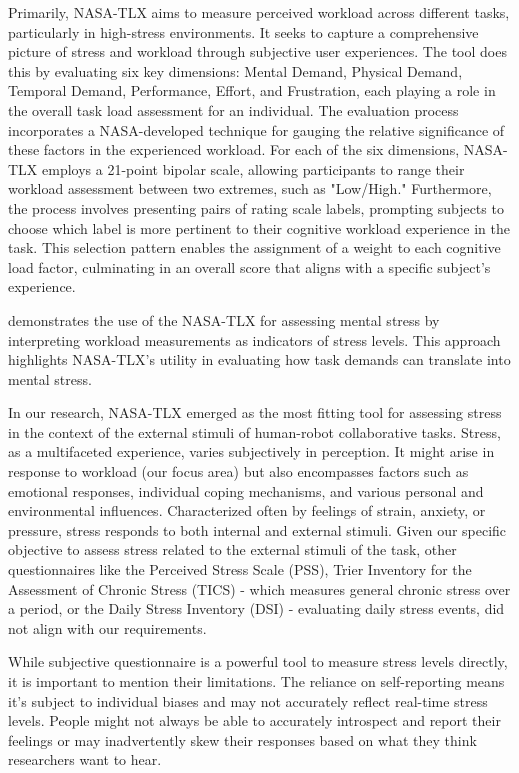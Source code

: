  Primarily, NASA-TLX aims to measure perceived workload across different tasks, particularly in high-stress environments. It seeks to capture a comprehensive picture of stress and workload through subjective user experiences. The tool does this by evaluating six key dimensions: Mental Demand, Physical Demand, Temporal Demand, Performance, Effort, and Frustration, each playing a role in the overall task load assessment for an individual. The evaluation process incorporates a NASA-developed technique for gauging the relative significance of these factors in the experienced workload. For each of the six dimensions, NASA-TLX employs a 21-point bipolar scale, allowing participants to range their workload assessment between two extremes, such as "Low/High." Furthermore, the process involves presenting pairs of rating scale labels, prompting subjects to choose which label is more pertinent to their cognitive workload experience in the task. This selection pattern enables the assignment of a weight to each cognitive load factor, culminating in an overall score that aligns with a specific subject's experience.

 \textcite{tlxstress} demonstrates the use of the NASA-TLX for assessing mental stress by interpreting workload measurements as indicators of stress levels. This approach highlights NASA-TLX's utility in evaluating how task demands can translate into mental stress.
 
 In our research, NASA-TLX emerged as the most fitting tool for assessing stress in the context of the external stimuli of human-robot collaborative tasks. Stress, as a multifaceted experience, varies subjectively in perception. It might arise in response to workload (our focus area) but also encompasses factors such as emotional responses, individual coping mechanisms, and various personal and environmental influences. Characterized often by feelings of strain, anxiety, or pressure, stress responds to both internal and external stimuli. Given our specific objective to assess stress related to the external stimuli of the task, other questionnaires like the Perceived Stress Scale (PSS), Trier Inventory for the Assessment of Chronic Stress (TICS) \parencite{tics} - which measures general chronic stress over a period, or the Daily Stress Inventory (DSI) \parencite{dsi} - evaluating daily stress events, did not align with our requirements.

While subjective questionnaire is a powerful tool to measure stress levels directly, it is important to mention their limitations. The reliance on self-reporting means it's subject to individual biases and may not accurately reflect real-time stress levels. People might not always be able to accurately introspect and report their feelings or may inadvertently skew their responses based on what they think researchers want to hear.




